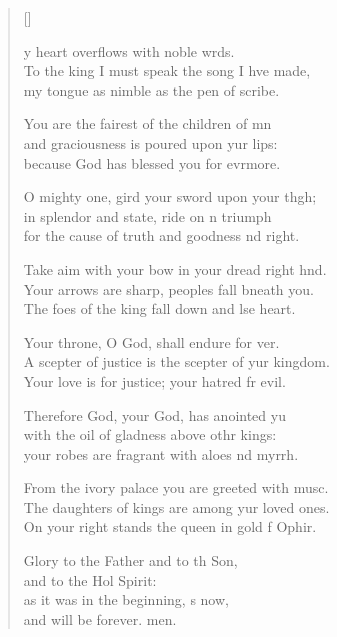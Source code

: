 \settowidth{\versewidth}{A scepter of justice is the scepter of your kingdom. *}
\begin{verse}[\versewidth]
  \begin{patverse}
y heart overflows with noble wrds.\Flex\\
To the king I must speak the song I hve made,\Med\\
my tongue as nimble as the pen of  scribe.

You are the fairest of the children of mn\Flex\\
and graciousness is poured upon yur lips:\Med\\
because God has blessed you for evrmore.

O mighty one, gird your sword upon your th\pointup{\i}gh;\Flex\\
in splendor and state, ride on \pointup{\i}n triumph\Med\\
for the cause of truth and goodness nd right.

Take aim with your bow in your dread right hnd.\Flex\\
Your arrows are sharp, peoples fall bneath you.\Med\\
The foes of the king fall down and lse heart.

Your throne, O God, shall endure for ver.\Flex\\
A scepter of justice is the scepter of yur kingdom.\Med\\
Your love is for justice; your hatred fr evil.

Therefore God, your God, has anointed yu\Flex\\
with the oil of gladness above othr kings:\Med\\
your robes are fragrant with aloes nd myrrh.

From the ivory palace you are greeted with mus\pointup{\i}c.\Flex\\
The daughters of kings are among yur loved ones.\Med\\
On your right stands the queen in gold f Ophir.

Glory to the Father and to th Son,\Med\\
and to the Hol Spirit:\\
as it was in the beginning, \pointup{\i}s now,\Med\\
and will be forever. men. 
  \end{patverse}
\end{verse}

